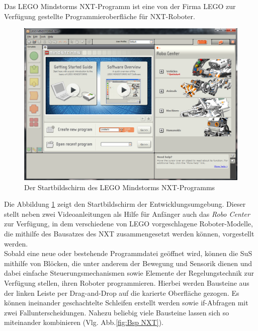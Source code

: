 \documentclass[paper=a4, pagesize, DIV=calc, BCOR=12.5mm, twoside=on, onecolumn=on, open = any, titlepage =on, parskip =half-, headsepline = on, footsepline = on, chapterprefix = on, appendixprefix = off, fontsize = 12pt, numbers = noenddot, abstract = on]{scrbook}
\numberwithin{equation}{chapter}
\theoremstyle{definition}
\theoremstyle{plain}
\theoremstyle{plain}
\theoremstyle{remark}
\theoremstyle{plain}
\theoremstyle{plain}
\begin{document}
Das LEGO Mindstorms NXT-Programm ist eine von der Firma LEGO zur Verfügung gestellte Programmieroberfläche für NXT-Roboter.\\
\begin{figure}[htbp]
\centering
\includegraphics[scale=0.54]{images/Startbildschirm_NXT.png} 
\caption{Der Startbildschirm des LEGO Mindstorms NXT-Programms}
\label{fig:NXT Start}
\end{figure}
Die Abbildung \ref{fig:NXT Start} zeigt den Startbildschirm der Entwicklungsumgebung. Dieser stellt neben zwei Videoanleitungen als Hilfe für Anfänger auch das \emph{Robo Center} zur Verfügung, in dem verschiedene von LEGO vorgeschlagene Roboter-Modelle, die mithilfe des Bausatzes des NXT zusammengesetzt werden können, vorgestellt werden.\\

Sobald eine neue oder bestehende Programmdatei geöffnet wird, können die SuS mithilfe von Blöcken, die unter anderem der Bewegung und Sensorik dienen und dabei einfache Steuerungsmechanismen sowie Elemente der Regelungstechnik zur Verfügung stellen, ihren Roboter programmieren. Hierbei werden Bausteine aus der linken Leiste per Drag-and-Drop auf die karierte Oberfläche gezogen. Es können ineinander geschachtelte Schleifen erstellt werden sowie if-Abfragen mit zwei Fallunterscheidungen. Nahezu beliebig viele Bausteine lassen sich so miteinander kombinieren (Vlg. Abb.\ref{fig:Bsp NXT}).\\
\end{document}
